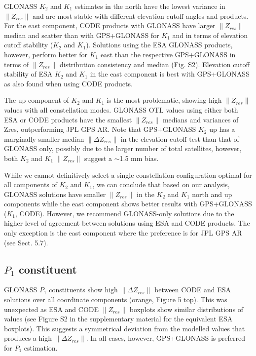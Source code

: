 \documentclass[se, manuscript]{copernicus}
\begin{document}
GLONASS $K_2$ and $K_1$ estimates in the north have the lowest variance in $\|Z_{res}\|$ and are most stable with different elevation cutoff angles and products. For the east component, CODE products with GLONASS have larger $\|Z_{res}\|$ median and scatter than with GPS+GLONASS for $K_1$ and in terms of elevation cutoff stability ($K_2$ and $K_1$). Solutions using the ESA GLONASS products, however, perform better for $K_1$ east than the respective GPS+GLONASS in terms of $\|Z_{res}\|$ distribution consistency and median (Fig. S2). Elevation cutoff stability of ESA $K_2$ and $K_1$ in the east component is best with GPS+GLONASS as also found when using CODE products.

The up component of $K_2$ and $K_1$ is the most problematic, showing high $\|Z_{res}\|$ values with all constellation modes. GLONASS OTL values using either both ESA or CODE products have the smallest $\|Z_{res}\|$ medians and variances of Zres, outperforming JPL GPS AR. Note that GPS+GLONASS $K_2$ up has a marginally smaller median $\|\Delta Z_{res}\|$ in the elevation cutoff test than that of GLONASS only, possibly due to the larger number of total satellites, however, both $K_2$ and $K_1$ $\|Z_{res}\|$ suggest a $\sim$1.5 mm bias.

While we cannot definitively select a single constellation configuration optimal for all components of $K_2$ and $K_1$, we can conclude that based on our analysis, GLONASS solutions have smaller $\|Z_{res}\|$ in the $K_2$ and $K_1$ north and up components while the east component shows better results with GPS+GLONASS ($K_1$, CODE). However, we recommend GLONASS-only solutions due to the higher level of agreement between solutions using ESA and CODE products. The only exception is the east component where the preference is for JPL GPS AR (see Sect. 5.7).

\subsection{$P_1$ constituent}
GLONASS $P_1$ constituents show high $\|\Delta Z_{res}\|$ between CODE and ESA solutions over all coordinate components (orange, Figure 5 top). This was unexpected as ESA and CODE $\|Z_{res}\|$ boxplots show similar distributions of values (see Figure S2 in the supplementary material for the equivalent ESA boxplots). This suggests a symmetrical deviation from the modelled values that produces a high $\|\Delta Z_{res}\|$. In all cases, however, GPS+GLONASS is preferred for $P_1$ estimation.
\end{document}
